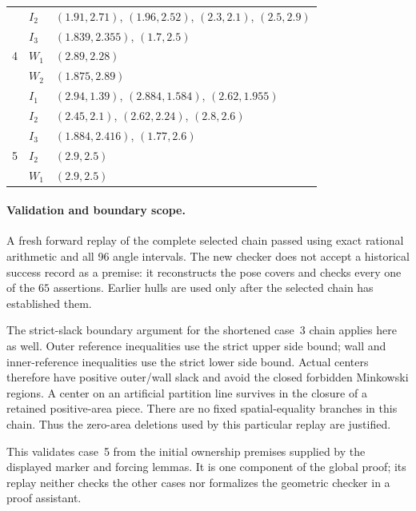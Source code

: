 \documentclass[11pt]{article}
\begin{document}
\begin{longtable}{@{}c l p{}@{}}
 & $I_2$ & $(1.91,2.71)$, $(1.96,2.52)$, $(2.3,2.1)$, $(2.5,2.9)$\\
 & $I_3$ & $(1.839,2.355)$, $(1.7,2.5)$\\
\midrule
4 & $W_1$ & $(2.89,2.28)$\\
 & $W_2$ & $(1.875,2.89)$\\
 & $I_1$ & $(2.94,1.39)$, $(2.884,1.584)$, $(2.62,1.955)$\\
 & $I_2$ & $(2.45,2.1)$, $(2.62,2.24)$, $(2.8,2.6)$\\
 & $I_3$ & $(1.884,2.416)$, $(1.77,2.6)$\\
\midrule
5 & $I_2$ & $(2.9,2.5)$\\
 & $W_1$ & $(2.9,2.5)$\\
\bottomrule
\end{longtable}
\endgroup

\paragraph{Validation and boundary scope.}
A fresh forward replay of the complete selected chain passed using exact
rational arithmetic and all 96 angle intervals.  The new checker does not
accept a historical success record as a premise: it reconstructs the pose
covers and checks every one of the $65$ assertions. Earlier hulls are used
only after the selected chain has established them.

The strict-slack boundary argument for the shortened case~3 chain applies
here as well.  Outer reference inequalities use the strict upper side
bound; wall and inner-reference inequalities use the strict lower side
bound.  Actual centers therefore have positive outer/wall slack and avoid
the closed forbidden Minkowski regions.  A center on an artificial
partition line survives in the closure of a retained positive-area piece.
There are no fixed spatial-equality branches in this chain.  Thus the
zero-area deletions used by this particular replay are justified.

This validates case~5 from the initial ownership premises supplied by
the displayed marker and forcing lemmas. It is one component of the global
proof; its replay neither checks the other cases nor formalizes the
geometric checker in a proof assistant.
\end{document}
